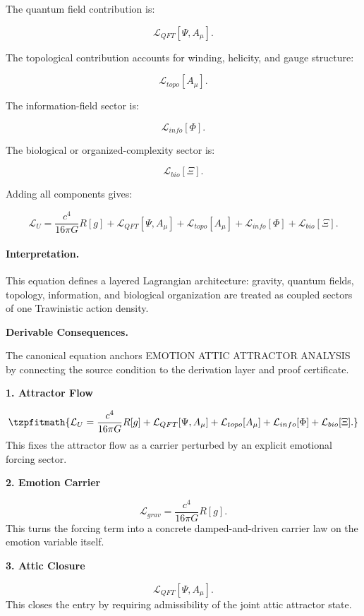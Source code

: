 The quantum field contribution is:

\begin{equation}
\mathcal{L}_{QFT}[\Psi,A_\mu].
\end{equation}

The topological contribution accounts for winding, helicity, and gauge structure:

\begin{equation}
\mathcal{L}_{topo}[A_\mu].
\end{equation}

The information-field sector is:

\begin{equation}
\mathcal{L}_{info}[\Phi].
\end{equation}

The biological or organized-complexity sector is:

\begin{equation}
\mathcal{L}_{bio}[\Xi].
\end{equation}

Adding all components gives:

\begin{equation}
\boxed{
\mathcal{L}_U
=
\frac{c^4}{16\pi G}R[g]
+
\mathcal{L}_{QFT}[\Psi,A_\mu]
+
\mathcal{L}_{topo}[A_\mu]
+
\mathcal{L}_{info}[\Phi]
+
\mathcal{L}_{bio}[\Xi].
}
\end{equation}

\paragraph{Interpretation.}
This equation defines a layered Lagrangian architecture: gravity, quantum fields, topology, information, and biological organization are treated as coupled sectors of one Trawinistic action density.

\par\vspace{0.35em}
\noindent\textbf{Derivable Consequences.}\quad
\begingroup
\footnotesize
\raggedright
The canonical equation anchors EMOTION ATTIC ATTRACTOR ANALYSIS by connecting the source condition to the derivation layer and proof certificate.
\par\endgroup

\noindent\textbf{1. Attractor Flow}\par
\[
\tzpfitmath{\mathcal{L}_U = \frac{c^4}{16\pi G}R[g] + \mathcal{L}_{QFT}[\Psi,A_\mu] + \mathcal{L}_{topo}[A_\mu] + \mathcal{L}_{info}[\Phi] + \mathcal{L}_{bio}[\Xi].}
\]
\noindent This fixes the attractor flow as a carrier perturbed by an explicit emotional forcing sector.\par
\noindent\textbf{2. Emotion Carrier}\par
\[
\mathcal{L}_{grav} = \frac{c^4}{16\pi G}R[g].
\]
\noindent This turns the forcing term into a concrete damped-and-driven carrier law on the emotion variable itself.\par
\noindent\textbf{3. Attic Closure}\par
\[
\mathcal{L}_{QFT}[\Psi,A_\mu].
\]
\noindent This closes the entry by requiring admissibility of the joint attic attractor state.\par

